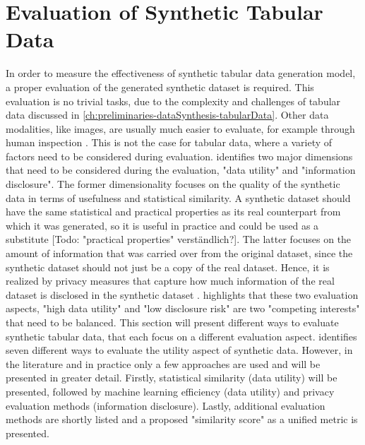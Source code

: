 \section{Evaluation of Synthetic Tabular Data}
\label{ch:preliminaries-evaluationOfSyntheticTabularData}

In order to measure the effectiveness of synthetic tabular data generation model, a proper evaluation of the generated synthetic dataset is required.
This evaluation is no trivial tasks, due to the complexity and challenges of tabular data discussed in \autoref{ch:preliminaries-dataSynthesis-tabularData}.
Other data modalities, like images, are usually much easier to evaluate, for example through human inspection \cite{chundawat2022UniversalMetricRobust}. 
This is not the case for tabular data, where a variety of factors need to be considered during evaluation.
\cite{goncalves2020GenerationEvaluationSynthetic} identifies two major dimensions that need to be considered during the evaluation, "data utility" and "information disclosure".
The former dimensionality focuses on the quality of the synthetic data in terms of usefulness and statistical similarity.
A synthetic dataset should have the same statistical and practical properties as its real counterpart from which it was generated, so it is useful in practice and could be used as a substitute  [Todo: "practical properties" verständlich?].
The latter focuses on the amount of information that was carried over from the original dataset, since the synthetic dataset should not just be a copy of the real dataset.
Hence, it is realized by privacy measures that capture how much information of the real dataset is disclosed in the synthetic dataset \cite{goncalves2020GenerationEvaluationSynthetic}.
\cite[p. 2]{little2021GenerativeAdversarialNetworksa} highlights that these two evaluation aspects, "high data utility" and "low disclosure risk" are two "competing interests" that need to be balanced.
This section will present different ways to evaluate synthetic tabular data, that each focus on a different evaluation aspect.
\cite{elemam2020SevenWaysEvaluate} identifies seven different ways to evaluate the utility aspect of synthetic data.
However, in the literature and in practice only a few approaches are used and will be presented in greater detail.
Firstly, statistical similarity (data utility) will be presented, followed by machine learning efficiency (data utility) and privacy evaluation methods (information disclosure).
Lastly, additional evaluation methods are shortly listed and a proposed "similarity score" as a unified metric is presented.

